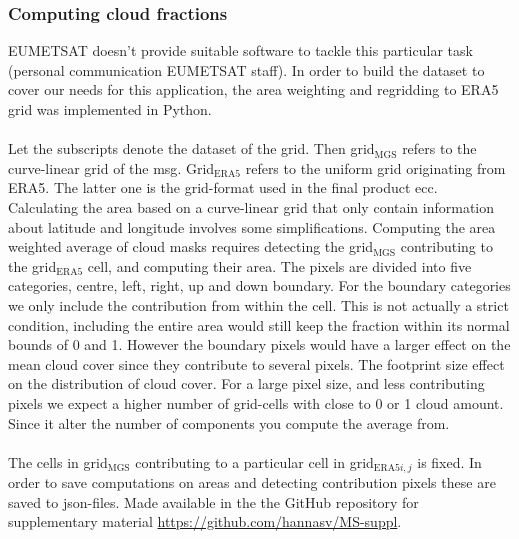 \subsubsection{Computing cloud fractions} \label{sec:remapping}
EUMETSAT doesn't provide suitable software to tackle this particular task (personal communication EUMETSAT staff). In order to build the dataset to cover our needs for this application, the area weighting and regridding to ERA5 grid was implemented in Python.
\\ \\ 
Let the subscripts denote the dataset of the grid. Then grid$_{\text{MGS}}$ refers to the curve-linear grid of the \acrlong{msg}. Grid$_{\text{ERA5}}$ refers to the uniform grid originating from ERA5. The latter one is the grid-format used in the final product \acrlong{ecc}. Calculating the area based on a curve-linear grid that only contain information about latitude and longitude involves some simplifications. Computing the area weighted average of cloud masks requires detecting the grid$_{\text{MGS}}$ contributing to the grid$_{\text{ERA5}}$ cell, and computing their area. The pixels are divided into five categories, centre, left, right, up and down boundary. 
For the boundary categories we only include the contribution from within the cell. This is not actually a strict condition, including the entire area would still keep the fraction within its normal bounds of 0 and 1. However the boundary pixels would have a larger effect on the mean cloud cover since they contribute to several pixels. The footprint size effect on the distribution of cloud cover. For a large pixel size, and less contributing pixels we expect a higher number of grid-cells with close to 0 or 1 cloud amount. Since it alter the number of components you compute the average from.
\\ \\
The cells in grid$_{\text{MGS}}$ contributing to a particular cell in grid$_{\text{ERA5}i,j}$ is fixed. In order to save computations on areas and detecting contribution pixels these are saved to \acrshort{json}-files. Made available in the the GitHub repository for supplementary material \href{https://github.com/hannasv/MS-suppl}{https://github.com/hannasv/MS-suppl}.
